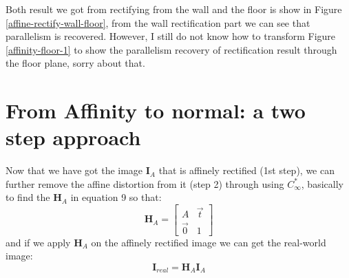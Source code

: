 \documentclass[conference]{IEEEtran}
\let\oldvec\vec
\renewcommand{\vec}[1]{\oldvec{\mathit{#1}}}
\newcommand{\mat}[1]{\mathbf{#1}} %
\begin{document}
Both result we got from rectifying from the wall and the floor is show in Figure \ref{affine-rectify-wall-floor}, from the wall rectification part we can see that parallelism is recovered. However, I still do not know how to transform Figure \ref{affinity-floor-1} to show the parallelism recovery of rectification result through the floor plane, sorry about that.
\begin{figure*}
  \centering
  \caption{Affinely Rectification through Wall vs. Floor}
  \label{affine-rectify-wall-floor} %
\end{figure*}

\section{From Affinity to normal: a two step approach}
Now that we have got the image $\mat{I}_A$ that is affinely rectified (1st step), we can further remove the affine distortion from it (step 2) through using $C_{\infty}^*$, basically to find the $\mat{H}_A$ in equation 9 so that:
\begin{equation}
	\mat{H}_A = \begin{bmatrix}
		A & \vec{t} \\
		\vec{0} & 1
	\end{bmatrix}
\end{equation}
and if we apply $\mat{H}_A$ on the affinely rectified image we can get the real-world image:
\begin{equation}
	\mat{I}_{real} = \mat{H}_A\mat{I}_A
\end{equation} 
\end{document}
